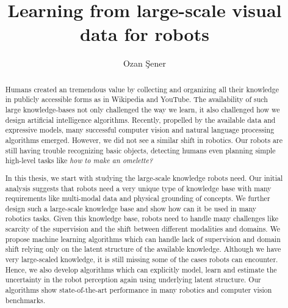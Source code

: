 \documentclass[phd,tocprelim]{cornell}
\title {Learning from large-scale visual data for robots}
\author {Ozan \c{S}ener}
\begin{document}
\maketitle
\makecopyright

\begin{abstract}
Humans created an tremendous value by collecting and organizing all their knowledge in publicly accessible forms as in Wikipedia and YouTube. The availability of such large knowledge-bases not only challenged the way we learn, it also challenged how we design artificial intelligence algorithms. Recently, propelled by the available data and expressive models, many successful computer vision and natural language processing algorithms emerged. However, we did not see a similar shift in robotics. Our robots are still having trouble recognizing basic objects, detecting humans even planning simple high-level tasks like \emph{how to make an omelette?}

In this thesis, we start with studying the large-scale knowledge robots need. Our initial analysis suggests that robots need a very unique type of knowledge base with many requirements like multi-modal data and physical grounding of concepts. We further design such a large-scale knowledge base and show how can it be used in many robotics tasks. Given this knowledge base, robots need to handle many challenges like scarcity of the supervision and the shift between different modalities and domains. We propose machine learning algorithms which can handle lack of supervision and domain shift relying only on the latent structure of the available knowledge. Although we have very large-scaled knowledge, it is still missing some of the cases robots can encounter. Hence, we also develop algorithms which can explicitly model, learn and estimate the uncertainty in the robot perception again using underlying latent structure. Our algorithms show state-of-the-art performance in many robotics and computer vision benchmarks.

\end{abstract}
\end{document}
